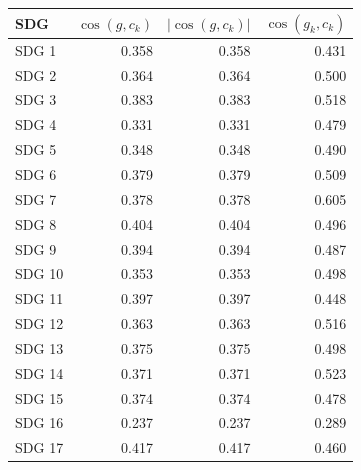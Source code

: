 \begin{tabular}{lrrr}
\toprule
SDG & $\cos(g, c_k)$ & $|\cos(g, c_k)|$ & $\cos(g_k, c_k)$ \\
\midrule
SDG 1 & 0.358 & 0.358 & 0.431 \\
SDG 2 & 0.364 & 0.364 & 0.500 \\
SDG 3 & 0.383 & 0.383 & 0.518 \\
SDG 4 & 0.331 & 0.331 & 0.479 \\
SDG 5 & 0.348 & 0.348 & 0.490 \\
SDG 6 & 0.379 & 0.379 & 0.509 \\
SDG 7 & 0.378 & 0.378 & 0.605 \\
SDG 8 & 0.404 & 0.404 & 0.496 \\
SDG 9 & 0.394 & 0.394 & 0.487 \\
SDG 10 & 0.353 & 0.353 & 0.498 \\
SDG 11 & 0.397 & 0.397 & 0.448 \\
SDG 12 & 0.363 & 0.363 & 0.516 \\
SDG 13 & 0.375 & 0.375 & 0.498 \\
SDG 14 & 0.371 & 0.371 & 0.523 \\
SDG 15 & 0.374 & 0.374 & 0.478 \\
SDG 16 & 0.237 & 0.237 & 0.289 \\
SDG 17 & 0.417 & 0.417 & 0.460 \\
\bottomrule
\end{tabular}
